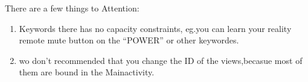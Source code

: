 \documentclass[letterpaper,10pt,english]{sphinxmanual}
\begin{document}
\begin{CJK}{UTF8}{gbsn}
There are a few things to Attention:
\begin{enumerate}
\item {} 
Keywords there has no capacity constraints, eg.you can learn your reality remote mute button on the ``POWER'' or other keywordes.

\item {} 
wo don't recommended that you change the ID of the views,becasue most of them are bound in the Mainactivity.

\end{enumerate}



\renewcommand{\indexname}{Index}
\printindex
\end{CJK} 
\end{document}
